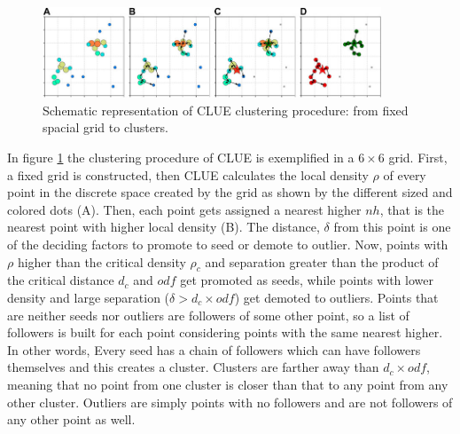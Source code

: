 \begin{figure}[ht]
    \centering
    \includegraphics[width=0.9\textwidth]{media/clustering_procedure.jpg}
    \caption{Schematic representation of CLUE clustering procedure: from fixed spacial grid to clusters.}
    \label{fig:clustering_procedure}
\end{figure}

In figure \ref{fig:clustering_procedure} the clustering procedure of CLUE is exemplified in a $6\times6$ grid. First, a fixed grid is constructed, then CLUE calculates the local density $\rho$ of every point in the discrete space created by the grid as shown by the different sized and colored dots (A). Then, each point gets assigned a nearest higher $nh$, that is the nearest point with higher local density (B). The distance, $\delta$ from this point is one of the deciding factors to promote to seed or demote to outlier. Now, points with $\rho$ higher than the critical density $\rho_c$ and separation greater than the product of the critical distance $d_c$ and $odf$ get promoted as seeds, while points with lower density and large separation ($\delta > d_c \times odf$) get demoted to outliers. Points that are neither seeds nor outliers are followers of some other point, so a list of followers is built for each point considering points with the same nearest higher. In other words, Every seed has a chain of followers which can have followers themselves and this creates a cluster. Clusters are farther away than $d_c \times odf$, meaning that no point from one cluster is closer than that to any point from any other cluster. Outliers are simply points with no followers and are not followers of any other point as well.

